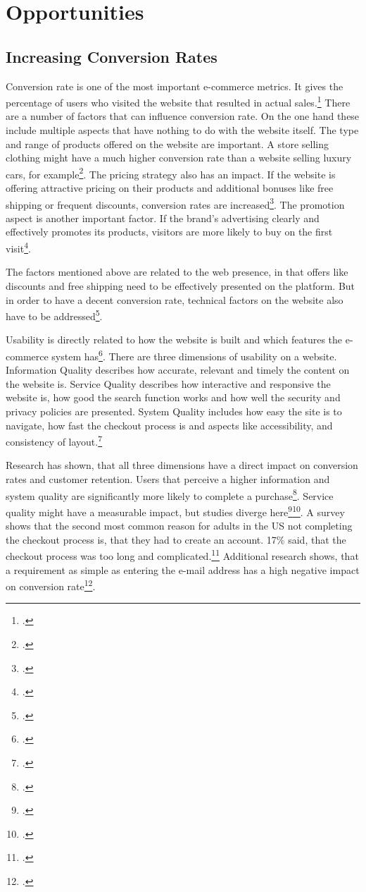 \newpage
\section{Opportunities}
\label{sec:opportunities}

\subsection{Increasing Conversion Rates}

Conversion rate is one of the most important e-commerce metrics.
It gives the percentage of users who visited the website that resulted in actual sales.\footcite[Cp.][p. 1]{Gabir2018}
There are a number of factors that can influence conversion rate.
On the one hand these include multiple aspects that have nothing to do with the website itself.
The type and range of products offered on the website are important.
A store selling clothing might have a much higher conversion rate than a website selling luxury cars, for example\footcite[Cp.][p.165]{Fatta2018}.
The pricing strategy also has an impact. If the website is offering attractive pricing on their products and additional
bonuses like free shipping or frequent discounts, conversion rates are increased\footcite[Cp.][p.165]{Fatta2018}.
The promotion aspect is another important factor. If the brand's advertising clearly and effectively promotes its products,
visitors are more likely to buy on the first visit\footcite[Cp.][p.165]{Fatta2018}.

The factors mentioned above are related to the web presence, in that offers like discounts and free shipping
need to be effectively presented on the platform. But in order to have a decent conversion rate, technical
factors on the website also have to be addressed\footcite[Cp.][p. 5]{Gabir2018}.

Usability is directly related to how the website is built and which features the e-commerce system has\footcite[Cp.][p. 2f]{Gabir2018}.
There are three dimensions of usability on a website.
Information Quality describes how accurate, relevant and timely the content on the website is.
Service Quality describes how interactive and responsive the website is, how good the search function works
and how well the security and privacy policies are presented.
System Quality includes how easy the site is to navigate, how fast the checkout process is
and aspects like accessibility, and consistency of layout.\footcite[Cp. ][p. 3]{Kuan}

Research has shown, that all three dimensions have a direct impact on conversion rates and customer retention.
Users that perceive a higher information and system quality are significantly more likely to complete
a purchase\footcite[Cp.][p. 6]{Kuan}.
Service quality might have a measurable impact, but studies diverge here\footcite[Cp.][p. 6]{Kuan}\footcite[Cp.][p. 5]{Gabir2018}.
A survey shows that the second most common reason for adults in the \ac{US} not completing the checkout
process is, that they had to create an account. 17\% said, that the checkout process was too long and complicated.\footcite[Cp.][]{Baymard2022}
Additional research shows, that a requirement as simple as entering the e-mail address has a high negative impact on conversion rate\footcite[Cp.][p. 4]{McDowell2016}.

